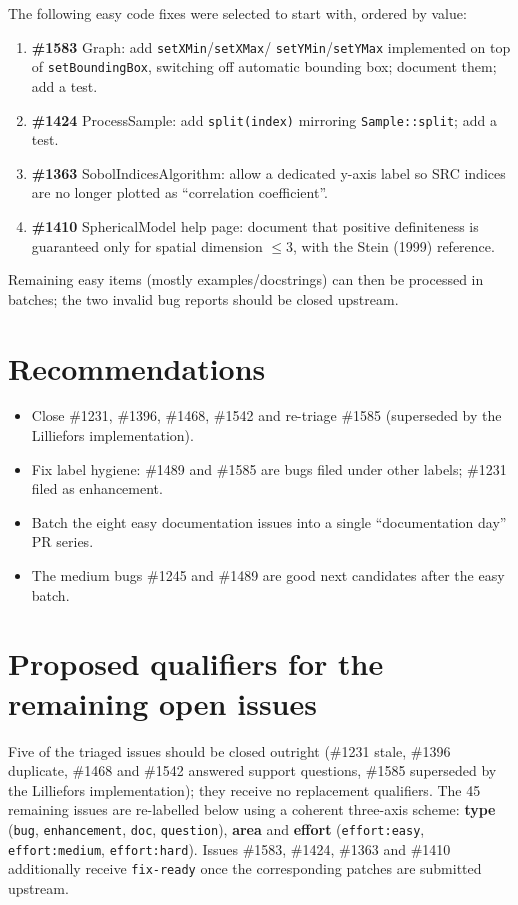 \documentclass[a4paper,11pt]{article}
\begin{document}
The following easy code fixes were selected to start with, ordered by value:
\begin{enumerate}[noitemsep]
  \item \textbf{\#1583} Graph: add \texttt{setXMin}/\texttt{setXMax}/%
        \texttt{setYMin}/\texttt{setYMax} implemented on top of
        \texttt{setBoundingBox}, switching off automatic bounding box;
        document them; add a test.
  \item \textbf{\#1424} ProcessSample: add \texttt{split(index)} mirroring
        \texttt{Sample::split}; add a test.
  \item \textbf{\#1363} SobolIndicesAlgorithm: allow a dedicated y-axis label
        so SRC indices are no longer plotted as ``correlation coefficient''.
  \item \textbf{\#1410} SphericalModel help page: document that positive
        definiteness is guaranteed only for spatial dimension $\leq 3$, with
        the Stein (1999) reference.
\end{enumerate}
Remaining easy items (mostly examples/docstrings) can then be processed in
batches; the two invalid bug reports should be closed upstream.

\section{Recommendations}

\begin{itemize}[noitemsep]
  \item Close \#1231, \#1396, \#1468, \#1542 and re-triage \#1585 (superseded
        by the Lilliefors implementation).
  \item Fix label hygiene: \#1489 and \#1585 are bugs filed under other labels;
        \#1231 filed as enhancement.
  \item Batch the eight easy documentation issues into a single
        ``documentation day'' PR series.
  \item The medium bugs \#1245 and \#1489 are good next candidates after the
        easy batch.
\end{itemize}


\section{Proposed qualifiers for the remaining open issues}

Five of the triaged issues should be closed outright (\#1231 stale,
\#1396 duplicate, \#1468 and \#1542 answered support questions, \#1585
superseded by the Lilliefors implementation); they receive no replacement
qualifiers. The 45 remaining issues are re-labelled below using a coherent
three-axis scheme: \textbf{type} (\texttt{bug}, \texttt{enhancement},
\texttt{doc}, \texttt{question}), \textbf{area} and \textbf{effort}
(\texttt{effort:easy}, \texttt{effort:medium}, \texttt{effort:hard}).
Issues \#1583, \#1424, \#1363 and \#1410 additionally receive
\texttt{fix-ready} once the corresponding patches are submitted upstream.
\end{document}
